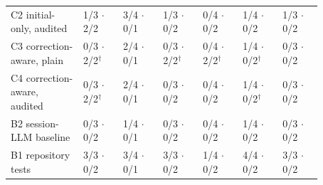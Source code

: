 \begin{table}[t]
\begin{tabular}{p{0.2\linewidth}p{0.112\linewidth}p{0.112\linewidth}p{0.112\linewidth}p{0.112\linewidth}p{0.112\linewidth}p{0.112\linewidth}}
\raggedright\hspace{0pt}C2 initial-only, audited & \raggedright\hspace{0pt}1/3 $\cdot$ 2/2 & \raggedright\hspace{0pt}3/4 $\cdot$ 0/1 & \raggedright\hspace{0pt}1/3 $\cdot$ 0/2 & \raggedright\hspace{0pt}0/4 $\cdot$ 0/2 & \raggedright\hspace{0pt}1/4 $\cdot$ 0/2 & \raggedright\hspace{0pt}1/3 $\cdot$ 0/2 \tabularnewline
\raggedright\hspace{0pt}C3 correction-aware, plain & \raggedright\hspace{0pt}0/3 $\cdot$ 2/2$^{\dagger}$ & \raggedright\hspace{0pt}2/4 $\cdot$ 0/1 & \raggedright\hspace{0pt}0/3 $\cdot$ 2/2$^{\dagger}$ & \raggedright\hspace{0pt}0/4 $\cdot$ 2/2$^{\dagger}$ & \raggedright\hspace{0pt}1/4 $\cdot$ 0/2$^{\dagger}$ & \raggedright\hspace{0pt}0/3 $\cdot$ 0/2 \tabularnewline
\raggedright\hspace{0pt}C4 correction-aware, audited & \raggedright\hspace{0pt}0/3 $\cdot$ 2/2$^{\dagger}$ & \raggedright\hspace{0pt}2/4 $\cdot$ 0/1 & \raggedright\hspace{0pt}0/3 $\cdot$ 0/2 & \raggedright\hspace{0pt}0/4 $\cdot$ 0/2 & \raggedright\hspace{0pt}1/4 $\cdot$ 0/2$^{\dagger}$ & \raggedright\hspace{0pt}0/3 $\cdot$ 0/2 \tabularnewline
\raggedright\hspace{0pt}B2 session-LLM baseline & \raggedright\hspace{0pt}0/3 $\cdot$ 0/2 & \raggedright\hspace{0pt}1/4 $\cdot$ 0/1 & \raggedright\hspace{0pt}0/3 $\cdot$ 0/2 & \raggedright\hspace{0pt}0/4 $\cdot$ 0/2 & \raggedright\hspace{0pt}1/4 $\cdot$ 0/2 & \raggedright\hspace{0pt}0/3 $\cdot$ 0/2 \tabularnewline
\raggedright\hspace{0pt}B1 repository tests & \raggedright\hspace{0pt}3/3 $\cdot$ 0/2 & \raggedright\hspace{0pt}3/4 $\cdot$ 0/1 & \raggedright\hspace{0pt}3/3 $\cdot$ 0/2 & \raggedright\hspace{0pt}1/4 $\cdot$ 0/2 & \raggedright\hspace{0pt}4/4 $\cdot$ 0/2 & \raggedright\hspace{0pt}3/3 $\cdot$ 0/2 \tabularnewline\midrule

\end{tabular}
\end{table}
